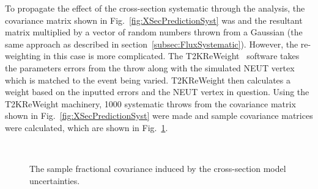 \newline
\newline
To propagate the effect of the cross-section systematic through the analysis, the covariance matrix shown in Fig.~\ref{fig:XSecPredictionSyst} was  and the resultant matrix multiplied by a vector of random numbers thrown from a Gaussian (the same approach as described in section~\ref{subsec:FluxSystematic}).  However, the re-weighting in this case is more complicated.  The T2KReWeight~\cite{T2KReWeightTN} software takes the parameters errors from the throw along with the simulated NEUT vertex which is matched to the event being varied.  T2KReWeight then calculates a weight based on the inputted errors and the NEUT vertex in question.  Using the T2KReWeight machinery, 1000 systematic throws from the covariance matrix shown in Fig.~\ref{fig:XSecPredictionSyst} were made and sample covariance matrices were calculated, which are shown in Fig.~\ref{fig:XSecCovarianceMatrices}.
\begin{figure}%
  \centering
  \\
  \caption{The sample fractional covariance induced by the cross-section model uncertainties.}
  \label{fig:XSecCovarianceMatrices}
\end{figure}
